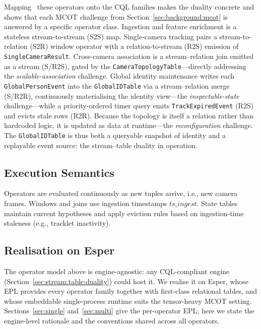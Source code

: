 \documentclass[review]{elsarticle}
\begin{document}
Mapping~ these operators onto the CQL families makes the duality concrete and shows that each MCOT challenge from Section~\ref{sec:background:mcot} is answered by a specific operator class. Ingestion and feature enrichment is a stateless stream-to-stream (S2S) map. Single-camera tracking pairs a stream-to-relation (S2R) window operator with a relation-to-stream (R2S) emission of \texttt{SingleCameraResult}. Cross-camera association is a stream--relation join emitted as a stream (S/R2S), gated by the \texttt{CameraTopologyTable}---directly addressing the \emph{scalable-association} challenge. Global identity maintenance writes each
\texttt{GlobalPersonEvent} into the \texttt{GlobalIDTable} via a stream--relation merge
(S/R2R), continuously materialising the identity view---the \emph{inspectable-state}
challenge---while a priority-ordered timer query emits \texttt{TrackExpiredEvent} (R2S) and
evicts stale rows (R2R). Because the topology is itself a relation rather than hardcoded
logic, it is updated as data at runtime---the \emph{reconfiguration} challenge. The
\texttt{GlobalIDTable} is thus both a queryable snapshot of identity and a replayable event
source: the stream--table duality in operation.

\subsection{Execution Semantics}
\label{sec:overview:execution}
Operators are evaluated continuously as new tuples arrive, i.e., new camera frames. Windows and joins use ingestion timestamps $\textit{ts\_ingest}$. State tables maintain current hypotheses and apply eviction rules based on ingestion-time staleness (e.g., tracklet inactivity).


\subsection{Realisation on Esper}
\label{sec:overview:realisation}
The operator model above is engine-agnostic: any CQL-compliant engine (Section~\ref{sec:stream:table:duality}) could host it. We realise it on Esper, whose EPL provides every operator family together with first-class relational tables, and whose embeddable single-process runtime suits the tensor-heavy MCOT setting. Sections~\ref{sec:single} and~\ref{sec:multi} give the per-operator EPL; here we state the engine-level rationale and the conventions shared across all operators.
\end{document}
